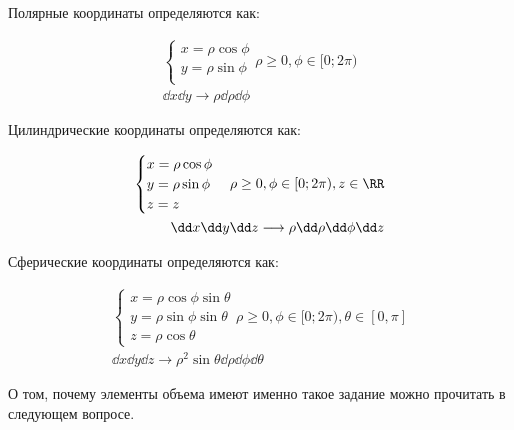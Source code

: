 
Полярные координаты определяются как:

\begin{align*}
  \begin{cases}
    x = \rho \cos \phi \\
    y = \rho \sin \phi \\
  \end{cases}
  \rho \ge 0, \phi \in [0; 2 \pi) \\
  \dd x \dd y \longrightarrow \rho \dd \rho \dd \phi
\end{align*}

Цилиндрические координаты определяются как:

\begin{align*}
  \begin{cases}
    x = \rho \cos \phi \\
    y = \rho \sin \phi \\
    z = z
  \end{cases}
  \rho \ge 0, \phi \in [0; 2 \pi), z \in \RR \\
  \dd x \dd y \dd z \longrightarrow \rho \dd \rho \dd \phi \dd z
\end{align*}

Сферические координаты определяются как:

\begin{align*}
  \begin{cases}
    x = \rho \cos \phi \sin \theta \\
    y = \rho \sin \phi \sin \theta \\
    z = \rho \cos \theta
  \end{cases}
  \rho \ge 0, \phi \in [0; 2 \pi), \theta \in [0, \pi] \\
  \dd x \dd y \dd z \longrightarrow
    \rho^2 \sin \theta \dd \rho \dd \phi \dd \theta
\end{align*}

\begin{remark}
  О том, почему элементы объема имеют именно такое задание можно прочитать в
  следующем вопросе.
\end{remark}

